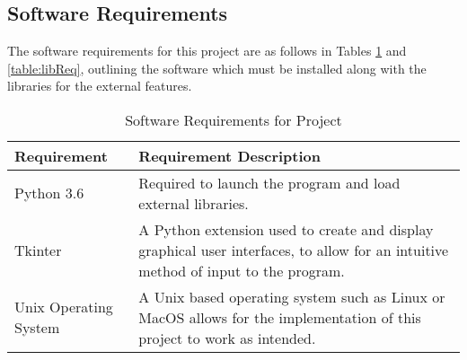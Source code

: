 \documentclass[12pt a4paper]{article}
\begin{document}
\subsection{Software Requirements}
The software requirements for this project are as follows in Tables \ref{table:softwareReq} and \ref{table:libReq}, outlining the software which must be installed along with the libraries for the external features. 
\begin{table}[H]
    \centering%
    \caption{Software Requirements for Project}
    \begin{tabular}{p{}|
                    p{}
                  }
        \hline Requirement & Requirement Description \\ \hline \hline
        Python 3.6 & Required to launch the program and load external libraries.\\ \hline
        Tkinter & A Python extension used to create and display graphical user interfaces, to allow for an intuitive method of input to the program. \\ \hline
        Unix Operating System & A Unix based operating system such as Linux or MacOS allows for the implementation of this project to work as intended.
        \label{table:softwareReq}
    \end{tabular}
\end{table}
\end{document}

